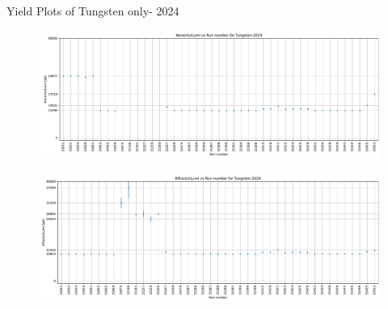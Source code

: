 \begin{frame}{Yield Plots of Tungsten only- 2024}
    \begin{figure}
        \centering
        \includegraphics[width=1.0\textwidth]{plots_runwise/NEventsbyLumi_2024_Tungsten.pdf}
    \end{figure}
    \vspace{-0.35cm}
    \begin{figure}
        \centering
        \includegraphics[width=1.0\textwidth]{plots_runwise/NTracksbyLumi_2024_Tungsten.pdf}
    \end{figure}
\end{frame}

